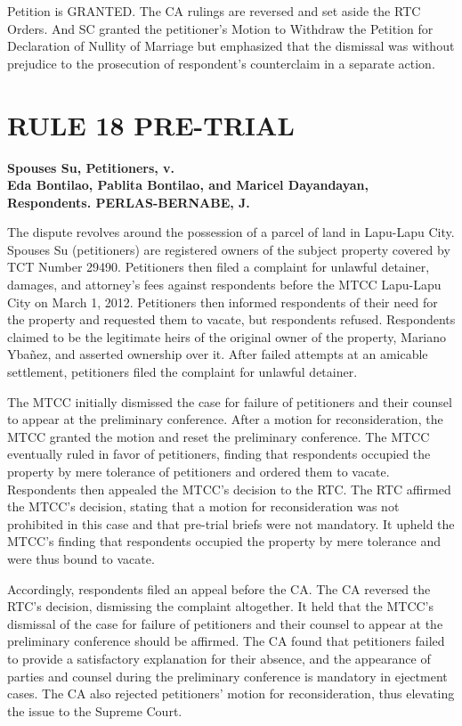\documentclass[
12pt,
oneside,
onehalfspacing,
headsepline
]{DigestCollection}
\begin{document}
Petition is GRANTED. The CA rulings are reversed and set aside the RTC Orders. And SC granted the petitioner's Motion to Withdraw the Petition for Declaration of Nullity of Marriage but emphasized that the dismissal was without prejudice to the prosecution of respondent's counterclaim in a separate action.

\chapter{RULE 18 PRE-TRIAL }
\label{050b4b10-0a12-11ef-932c-63c852f65e48}


\label{e8a1f4d0-0a0f-11ef-932c-63c852f65e48}


\noindent\textbf{Spouses Su, Petitioners, v. \\Eda Bontilao, Pablita Bontilao, and Maricel Dayandayan, Respondents. PERLAS-BERNABE, J.}\vspace{0.4cm}

The dispute revolves around the possession of a parcel of land in Lapu-Lapu City. Spouses Su (petitioners) are registered owners of the subject property covered by TCT Number 29490. Petitioners then filed a complaint for unlawful detainer, damages, and attorney's fees against respondents before the MTCC Lapu-Lapu City on March 1, 2012. Petitioners then informed respondents of their need for the property and requested them to vacate, but respondents refused. Respondents claimed to be the legitimate heirs of the original owner of the property, Mariano Ybañez, and asserted ownership over it. After failed attempts at an amicable settlement, petitioners filed the complaint for unlawful detainer. 

The MTCC initially dismissed the case for failure of petitioners and their counsel to appear at the preliminary conference. After a motion for reconsideration, the MTCC granted the motion and reset the preliminary conference. The MTCC eventually ruled in favor of petitioners, finding that respondents occupied the property by mere tolerance of petitioners and ordered them to vacate. Respondents then appealed the MTCC's decision to the RTC. The RTC affirmed the MTCC's decision, stating that a motion for reconsideration was not prohibited in this case and that pre-trial briefs were not mandatory. It upheld the MTCC's finding that respondents occupied the property by mere tolerance and were thus bound to vacate.

Accordingly, respondents filed an appeal before the CA. The CA reversed the RTC's decision, dismissing the complaint altogether. It held that the MTCC's dismissal of the case for failure of petitioners and their counsel to appear at the preliminary conference should be affirmed. The CA found that petitioners failed to provide a satisfactory explanation for their absence, and the appearance of parties and counsel during the preliminary conference is mandatory in ejectment cases. The CA also rejected petitioners' motion for reconsideration, thus elevating the issue to the Supreme Court.
\end{document}
